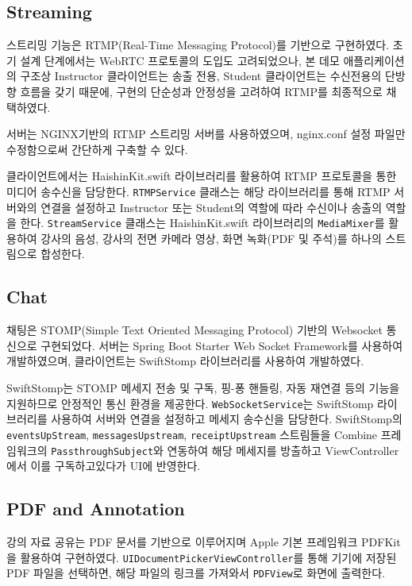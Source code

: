 \documentclass[pdflatex,sn-mathphys-num]{sn-jnl}%
\theoremstyle{thmstyleone}%
\theoremstyle{thmstyletwo}%
\theoremstyle{thmstylethree}%
\begin{document}
\subsection{Streaming}\label{subsec5}

스트리밍 기능은 RTMP(Real-Time Messaging Protocol)\cite{RTMP}를 기반으로 구현하였다. 초기 설계 단계에서는 WebRTC 프로토콜의 도입도 고려되었으나, 본 데모 애플리케이션의 구조상 Instructor 클라이언트는 송출 전용, Student 클라이언트는 수신전용의 단방향 흐름을 갖기 때문에, 구현의 단순성과 안정성을 고려하여 RTMP를 최종적으로 채택하였다.

서버는 NGINX\cite{NGINX}기반의 RTMP 스트리밍 서버를 사용하였으며, nginx.conf 설정 파일만 수정함으로써 간단하게 구축할 수 있다.

클라이언트에서는 HaishinKit.swift\cite{HaishinKit} 라이브러리를 활용하여 RTMP 프로토콜을 통한 미디어 송수신을 담당한다. \verb+RTMPService+ 클래스는 해당 라이브러리를 통해 RTMP 서버와의 연결을 설정하고 Instructor 또는 Student의 역할에 따라 수신이나 송출의 역할을 한다. \verb+StreamService+ 클래스는 HaishinKit.swift 라이브러리의 \verb+MediaMixer+를 활용하여 강사의 음성, 강사의 전면 카메라 영상, 화면 녹화(PDF 및 주석)를 하나의 스트림으로 합성한다.

\subsection{Chat}\label{subsec6}

채팅은 STOMP(Simple Text Oriented Messaging Protocol)\cite{STOMP} 기반의 Websocket 통신으로 구현되었다. 서버는 Spring Boot Starter Web Socket Framework를 사용하여 개발하였으며, 클라이언트는 SwiftStomp\cite{SwiftStomp} 라이브러리를 사용하여 개발하였다.

SwiftStomp는 STOMP 메세지 전송 및 구독, 핑-퐁 핸들링, 자동 재연결 등의 기능을 지원하므로 안정적인 통신 환경을 제공한다. \verb+WebSocketService+는 SwiftStomp 라이브러리를 사용하여 서버와 연결을 설정하고 메세지 송수신을 담당한다. SwiftStomp의 \verb+eventsUpStream+, \verb+messagesUpstream+, \verb+receiptUpstream+ 스트림들을 Combine 프레임워크의 \verb+PassthroughSubject+와 연동하여 해당 메세지를 방출하고 ViewController에서 이를 구독하고있다가 UI에 반영한다.

\subsection{PDF and Annotation}\label{subsec7}

강의 자료 공유는 PDF 문서를 기반으로 이루어지며 Apple 기본 프레임워크 PDFKit\cite{PDFKit}을 활용하여 구현하였다. \verb+UIDocumentPickerViewController+를 통해 기기에 저장된 PDF 파일을 선택하면, 해당 파일의 링크를 가져와서 \verb+PDFView+로 화면에 출력한다.
\end{document}
